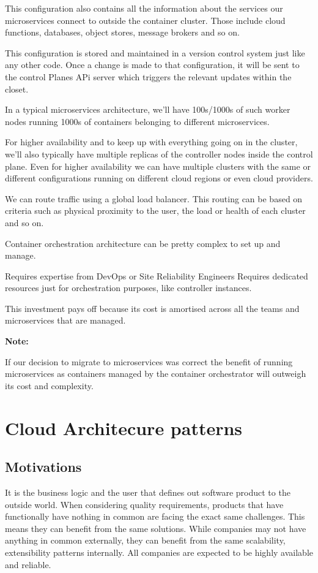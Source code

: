 \documentclass[a4paper, 11pt]{book}
\newenvironment{note}{
    \begin{siderule}
        \textbf{Note: }
        }{
    \end{siderule}}
\begin{document}
    This configuration also contains all the information about the services our microservices connect to outside the container cluster.
    Those include cloud functions, databases, object stores, message brokers and so on.

    This configuration is stored and maintained in a version control system just like any other code.
    Once a change is made to that configuration, it will be sent to the control Planes APi server which triggers the relevant updates within the closet.

    In a typical microservices architecture, we'll have 100s/1000s of such worker nodes running 1000s of containers belonging to different microservices.

    For higher availability and to keep up with everything going on in the cluster, we'll also typically have multiple replicas of the controller nodes inside the control plane.
    Even for higher availability we can have multiple clusters with the same or different configurations running on different cloud regions or even cloud providers.

    We can route traffic using a global load balancer.
    This routing can be based on criteria such as physical proximity to the user, the load or health of each cluster and so on.

    Container orchestration architecture can be pretty complex to set up and manage.

    Requires expertise from DevOps or Site Reliability Engineers
    Requires dedicated resources just for orchestration purposes, like controller instances.

    This investment pays off because its cost is amortised across all the teams and microservices that are managed.

    \begin{note}
        If our decision to migrate to microservices was correct the benefit of running microservices as containers managed by the container orchestrator will outweigh its cost and complexity.
    \end{note}

    \chapter{Cloud Architecure patterns}

    \section{Motivations}
    It is the business logic and the user that defines out software product to the outside world.
    When considering quality requirements, products that have functionally have nothing in common are facing the exact same challenges.
    This means they can benefit from the same solutions.
    While companies may not have anything in common externally, they can benefit from the same scalability, extensibility patterns internally.
    All companies are expected to be highly available and reliable.
\end{document}
